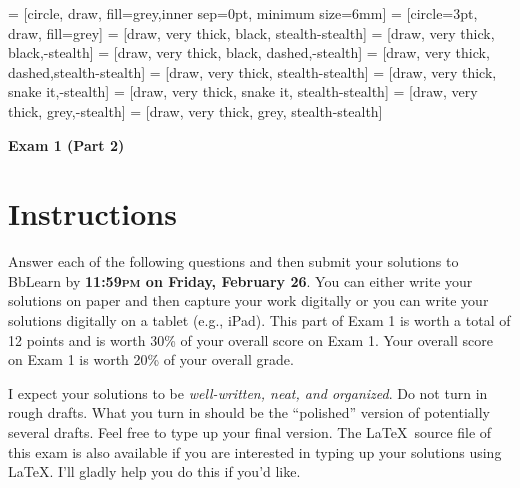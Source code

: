 \documentclass[11pt]{article}
\theoremstyle{definition}
\begin{document}
 = [circle, draw, fill=grey,inner sep=0pt, minimum size=6mm]
 = [circle=3pt, draw, fill=grey]
 = [draw, very  thick, black, stealth-stealth]
 = [draw, very  thick, black,-stealth]
 = [draw, very  thick, black, dashed,-stealth]
 = [draw, very thick, dashed,stealth-stealth]
 = [draw, very thick, stealth-stealth]
 = [draw, very thick, snake it,-stealth]
 = [draw, very thick, snake it, stealth-stealth]
 = [draw, very thick, grey,-stealth]
 = [draw, very thick, grey, stealth-stealth]

\begin{center}

{\Large\bf Exam 1 (Part 2)}

\bigskip

  
  \bigskip
  

\end{center}

\section*{Instructions}

Answer each of the following questions and then submit your solutions to BbLearn by \textbf{11:59\textsc{pm} on Friday, February 26}. You can either write your solutions on paper and then capture your work digitally or you can write your solutions digitally on a tablet (e.g., iPad). This part of Exam 1 is worth a total of 12 points and is worth 30\% of your overall score on Exam 1. Your overall score on Exam 1 is worth 20\% of your overall grade.

\bigskip

I expect your solutions to be \emph{well-written, neat, and organized}.  Do not turn in rough drafts.  What you turn in should be the ``polished'' version of potentially several drafts.  Feel free to type up your final version.  The \LaTeX\ source file of this exam is also available if you are interested in typing up your solutions using \LaTeX.  I'll gladly help you do this if you'd like.
\end{document}

